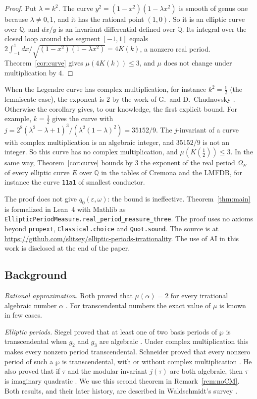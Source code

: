 \documentclass[11pt]{amsart}
\theoremstyle{definition}
\theoremstyle{remark}
\numberwithin{equation}{section}
\newcommand{\Q}{\mathbb Q}
\begin{document}
\begin{proof}
Put $\lambda=k^2$. The curve $y^2=(1-x^2)(1-\lambda x^2)$ is smooth of genus one because $\lambda\ne0,1$, and it
has the rational point $(1,0)$. So it is an elliptic curve over $\Q$, and $dx/y$ is an invariant differential
defined over $\Q$. Its integral over the closed loop around the segment $[-1,1]$ equals
$2\int_{-1}^{1}dx/\sqrt{(1-x^2)(1-\lambda x^2)}=4K(k)$, a nonzero real period. Theorem~\ref{cor:curve} gives
$\mu(4K(k))\le3$, and $\mu$ does not change under multiplication by $4$.
\end{proof}

When the Legendre curve has complex multiplication, for instance $k^2=\tfrac12$ (the lemniscate case), the
exponent is $2$ by the work of G.~and D.~Chudnovsky \cite{ChudnovskyChudnovsky26}. Otherwise the corollary
gives, to our knowledge, the first explicit bound. For example, $k=\tfrac12$ gives the curve with
$j=2^8(\lambda^2-\lambda+1)^3/(\lambda^2(1-\lambda)^2)=35152/9$. The $j$-invariant of a curve with complex
multiplication is an algebraic integer, and $35152/9$ is not an integer. So this curve has no complex
multiplication, and $\mu(K(\tfrac12))\le3$. In the same way, Theorem~\ref{cor:curve} bounds by $3$ the
exponent of the real period $\Omega_E$ of every elliptic curve $E$ over $\Q$ in the tables of Cremona and the
LMFDB, for instance the curve \texttt{11a1} of smallest conductor.

The proof does not give $q_0(\varepsilon,\omega)$: the
bound is ineffective. Theorem~\ref{thm:main} is formalized in Lean~4 with Mathlib as
\texttt{EllipticPeriodMeasure.\allowbreak real\_\allowbreak period\_\allowbreak measure\_\allowbreak three}.
The proof uses no axioms beyond \texttt{propext}, \texttt{Classical.choice} and \texttt{Quot.sound}. The source
is at \url{https://github.com/slitsey/elliptic-periods-irrationality}. The use of AI in this work is disclosed at
the end of the paper.

\subsection{Background}\label{ssec:background}
\emph{Rational approximation.} Roth proved that $\mu(\alpha)=2$ for every irrational algebraic number $\alpha$
\cite{Roth55}. For transcendental numbers the exact value of $\mu$ is known in few cases.

\emph{Elliptic periods.} Siegel proved that at least one of two basis periods of $\wp$ is transcendental when
$g_2$ and $g_3$ are algebraic \cite{Siegel32}. Under complex multiplication this makes every nonzero period
transcendental. Schneider proved that every nonzero period of such a $\wp$ is transcendental, with or without
complex multiplication \cite{Schneider37}. He also proved that if $\tau$ and the modular invariant $j(\tau)$
are both algebraic, then $\tau$ is imaginary quadratic \cite{Schneider37}. We use this second theorem in Remark~\ref{rem:noCM}. Both
results, and their later history, are described in Waldschmidt's survey \cite[Section~3.1]{Waldschmidt08}.
\end{document}
